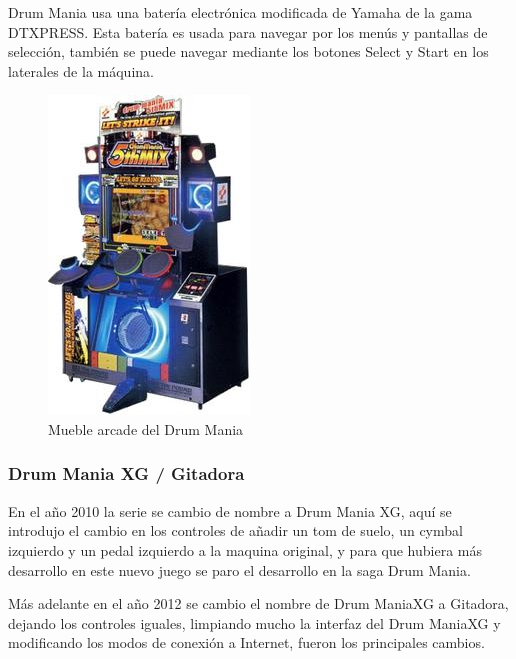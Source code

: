 \documentclass[a4paper,11pt,oneside]{book}
\begin{document}
Drum Mania usa una batería electrónica modificada de Yamaha de la gama DTXPRESS. Esta batería es usada para navegar por los menús y pantallas de selección, también se puede navegar mediante los botones Select y Start en los laterales de la máquina. 


\begin{figure}[H]
\begin{center}
\includegraphics[scale=0.5]{Imagenes/cabinet-drummania.jpg}
\caption{Mueble arcade del Drum Mania}
\label{Mueble arcade del Drum Mania}
\end{center}
\end{figure}

\subsubsection{Drum Mania XG / Gitadora}

En el año 2010 la serie se cambio de nombre a Drum Mania XG, aquí se introdujo el cambio en los controles de añadir un tom de suelo, un cymbal izquierdo y un pedal izquierdo a la maquina original, y para que hubiera más desarrollo en este nuevo juego se paro el desarrollo en la saga Drum Mania.

Más adelante en el año 2012 se cambio el nombre de Drum ManiaXG a Gitadora, dejando los controles iguales, limpiando mucho la interfaz del Drum ManiaXG y modificando los modos de conexión a Internet, fueron los principales cambios.
\end{document}

